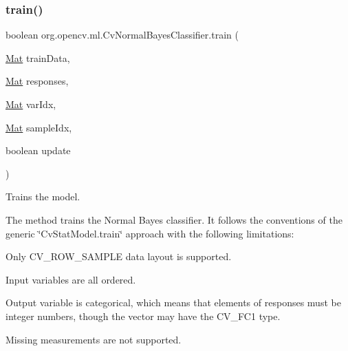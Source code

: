\subsubsection{\texorpdfstring{train()}{train()}\hspace{0.1cm}{\footnotesize\ttfamily [1/2]}}
{\footnotesize\ttfamily boolean org.\+opencv.\+ml.\+Cv\+Normal\+Bayes\+Classifier.\+train (\begin{DoxyParamCaption}\item[{\mbox{\hyperlink{classorg_1_1opencv_1_1core_1_1_mat}{Mat}}}]{train\+Data,  }\item[{\mbox{\hyperlink{classorg_1_1opencv_1_1core_1_1_mat}{Mat}}}]{responses,  }\item[{\mbox{\hyperlink{classorg_1_1opencv_1_1core_1_1_mat}{Mat}}}]{var\+Idx,  }\item[{\mbox{\hyperlink{classorg_1_1opencv_1_1core_1_1_mat}{Mat}}}]{sample\+Idx,  }\item[{boolean}]{update }\end{DoxyParamCaption})}

Trains the model.

The method trains the Normal Bayes classifier. It follows the conventions of the generic \char`\"{}\+Cv\+Stat\+Model.\+train\char`\"{} approach with the following limitations\+:


\begin{DoxyItemize}
\item Only {\ttfamily C\+V\+\_\+\+R\+O\+W\+\_\+\+S\+A\+M\+P\+LE} data layout is supported. 
\item Input variables are all ordered. 
\item Output variable is categorical, which means that elements of {\ttfamily responses} must be integer numbers, though the vector may have the {\ttfamily C\+V\+\_\+F\+C1} type. 
\item Missing measurements are not supported. 
\end{DoxyItemize}


